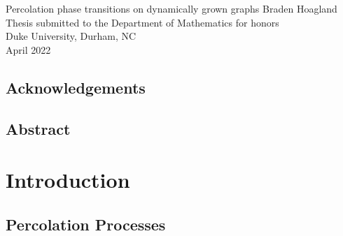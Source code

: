 \documentclass[twoside,10pt]{article}
\begin{document}


\formalTitle
{Percolation phase transitions on dynamically grown graphs}
{Braden Hoagland}
{
	Thesis submitted to the Department of Mathematics for honors\\
        Duke University, Durham, NC\\
        April 2022
}


\subsection*{Acknowledgements}
\lipsum[1]


\subsection*{Abstract}
\lipsum[2]

\thispagestyle{empty}
\tableofcontents
\newpage



\section{Introduction}

\lipsum[1]

\subsection{Percolation Processes}

\lipsum[2-3]
\end{document}
